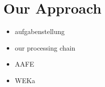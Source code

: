 \section{Our Approach}


\begin{itemize}
	\item aufgabenstellung
	\item our processing chain
	\item AAFE
	\item WEKa
\end{itemize}



